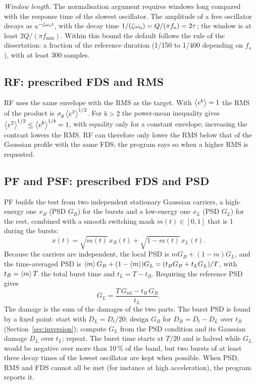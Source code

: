 \emph{Window length.} The normalisation argument requires windows long compared with the response
time of the slowest oscillator. The amplitude of a free oscillator decays as $e^{-\zeta\omega_{\mathrm{n}} t}$, with the
decay time $1/(\zeta\omega_{\mathrm{n}}) = Q/(\pi f_{\mathrm{n}}) = 2\tau$; the window is at least $2Q/(\pi f_{\min})$. Within this
bound the default follows the rule of the dissertation: a fraction of the reference duration (1/150 to
1/400 depending on $f_s$), with at least 300 samples.

\subsection{RF: prescribed FDS and RMS}

RF uses the same envelope with the RMS as the target. With $\left\langle e^b \right\rangle=1$ the RMS of the product is
$\sigma_g\left\langle e^2 \right\rangle^{1/2}$. For $b>2$ the power-mean inequality gives $\left\langle e^2 \right\rangle^{1/2}\le
\left\langle e^b \right\rangle^{1/b} = 1$, with equality only for a constant envelope; increasing the contrast lowers the
RMS. RF can therefore only lower the RMS below that of the Gaussian profile with the same FDS; the
program says so when a higher RMS is requested.

\subsection{PF and PSF: prescribed FDS and PSD}\label{sec:pf}

PF builds the test from two independent stationary Gaussian carriers, a high-energy one $x_B$ (PSD
$G_B$) for the bursts and a low-energy one $x_L$ (PSD $G_L$) for the rest, combined with a smooth
switching mask $m(t)\in[0,1]$ that is 1 during the bursts:
\begin{equation}
  x(t) = \sqrt{m(t)}\,x_B(t) + \sqrt{1-m(t)}\,x_L(t).
\end{equation}
Because the carriers are independent, the local PSD is $mG_B + (1-m)G_L$, and the time-averaged PSD is
$\left\langle m \right\rangle G_B + (1-\left\langle m \right\rangle)G_L = (t_BG_B + t_LG_L)/T$, with $t_B = \left\langle m \right\rangle T$ the total burst time and
$t_L = T-t_B$. Requiring the reference PSD gives
\begin{equation}
  G_L = \frac{T\,G_{\mathrm{ref}} - t_B\,G_B}{t_L}.
\end{equation}
The damage is the sum of the damages of the two parts. The burst PSD is found by a fixed point:
start with $D_L = D_t/20$; design $G_B$ for $D_B = D_t-D_L$ over $t_B$ (Section~\ref{sec:inversion});
compute $G_L$ from the PSD condition and its Gaussian damage $D_L$ over $t_L$; repeat. The burst time
starts at $T/20$ and is halved while $G_L$ would be negative over more than 10\,\% of the band, but
two bursts of at least three decay times of the lowest oscillator are kept when possible. When
PSD, RMS and FDS cannot all be met (for instance at high acceleration), the program reports it.

